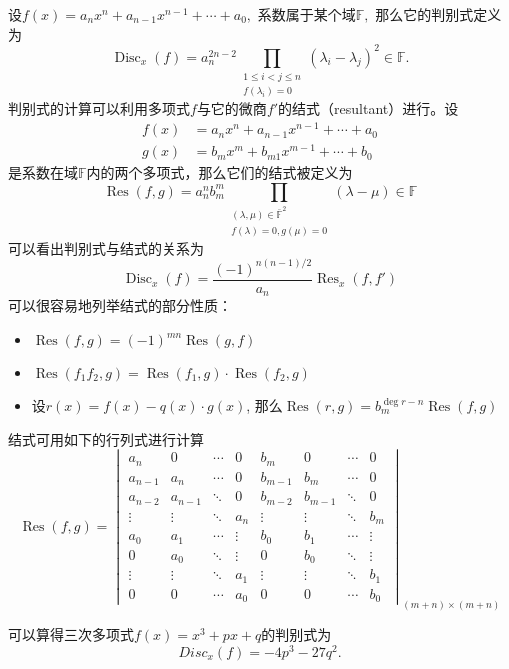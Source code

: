 设$f(x) = a_{n}x^{n} + a_{n-1}x^{n-1} + \cdots + a_{0},$ 系数属于某个域$\mathbb{F},$ 那么它的判别式定义为
$$\operatorname{Disc}_x(f) = a_n^{2n-2} \prod_{\substack{1 \leqslant i < j \leqslant n \\ f(\lambda_i) = 0}} (\lambda_i - \lambda_j)^2 \in \mathbb{F}.$$
判别式的计算可以利用多项式$f$与它的微商$f'$的结式（resultant）进行。设
\begin{align*}
f(x) & = a_{n}x^{n} + a_{n-1}x^{n-1} + \cdots + a_{0} \\
g(x) & = b_{m}x^{m} + b_{m1}x^{m-1} + \cdots + b_{0}
\end{align*}
是系数在域$\mathbb{F}$内的两个多项式，那么它们的结式被定义为
$$
\operatorname{Res} (f, g) = a_n^n b_m^m \prod_{ \substack{(\lambda, \mu) \in \bar{\mathbb{F}}^2 \\ f(\lambda) = 0, g(\mu) = 0}} (\lambda - \mu) \in \mathbb{F}
$$
可以看出判别式与结式的关系为
$$
\operatorname{Disc}_{x}(f) = \frac{(-1)^{n(n-1)/2}}{a_{n}} \operatorname{Res}_{x}(f, f')
$$
可以很容易地列举结式的部分性质：
\begin{itemize}
\item $\operatorname{Res} (f, g) = (-1)^{mn} \operatorname{Res} (g, f)$
\item $\operatorname{Res} (f_1f_2, g) = \operatorname{Res} (f_1, g) \cdot \operatorname{Res} (f_2, g)$
\item 设$r(x) = f(x) - q(x) \cdot g(x)$, 那么$\operatorname{Res} (r, g) = b_m^{\deg r - n}\operatorname{Res} (f, g)$
\end{itemize}
结式可用如下的行列式进行计算
$$
\operatorname{Res} (f, g) = \begin{vmatrix} a_{n} & 0 & \cdots & 0 & b_{m} & 0 & \cdots & 0 \\ a_{n-1} & a_{n} & \cdots & 0 & b_{m-1} & b_{m} & \cdots & 0 \\ a_{n-2} & a_{n-1} & \ddots & 0 & b_{m-2} & b_{m-1} & \ddots & 0 \\ \vdots & \vdots & \ddots & a_{n} & \vdots & \vdots & \ddots & b_{m} \\ a_{0} & a_{1} & \cdots & \vdots & b_{0} & b_{1} & \cdots & \vdots \\ 0 & a_{0} & \ddots & \vdots & 0 & b_{0} & \ddots & \vdots \\ \vdots & \vdots & \ddots & a_{1} & \vdots & \vdots & \ddots & b_{1} \\ 0 & 0 & \cdots & a_{0} & 0 & 0 & \cdots & b_{0}\end{vmatrix}_{(m+n) \times (m+n)}
$$

可以算得三次多项式$f(x) = x^3 + px + q$的判别式为
$$Disc_x(f) = -4p^3 - 27q^2.$$

